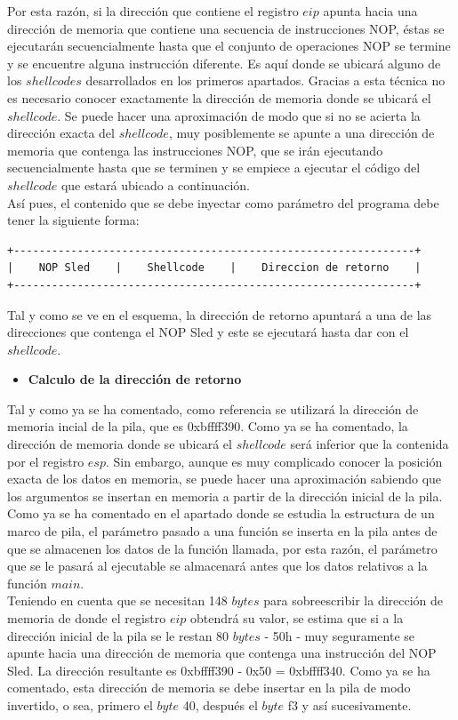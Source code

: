 \documentclass [titlepage, 12pt]{article}
\begin{document}
Por esta raz\'on, si la direcci\'on que contiene el registro $eip$ apunta hacia una direcci\'on de memoria que contiene una secuencia de instrucciones NOP, \'estas se ejecutar\'an secuencialmente hasta que el conjunto de operaciones NOP se termine y se encuentre alguna instrucci\'on diferente. Es aqu\'i donde se ubicar\'a alguno de los $shellcodes$ desarrollados en los primeros apartados. Gracias a esta t\'ecnica no es necesario conocer exactamente la direcci\'on de memoria donde se ubicar\'a el $shellcode$. Se puede hacer una aproximaci\'on de modo que si no se acierta la direcci\'on exacta del $shellcode$, muy posiblemente se apunte a una direcci\'on de memoria que contenga las instrucciones NOP, que se ir\'an ejecutando secuencialmente hasta que se terminen y se empiece a ejecutar el c\'odigo del $shellcode$ que estar\'a ubicado a continuaci\'on. \\
As\'i pues, el contenido que se debe inyectar como par\'ametro del programa debe tener la siguiente forma:

\begin{verbatim}
+---------------------------------------------------------------+
|    NOP Sled    |    Shellcode    |    Direccion de retorno    |
+---------------------------------------------------------------+
\end{verbatim}

Tal y como se ve en el esquema, la direcci\'on de retorno apuntar\'a a una de las direcciones que contenga el NOP Sled y este se ejecutar\'a hasta dar con el $shellcode$.

\begin{itemize}
	\item \textbf{Calculo de la direcci\'on de retorno}
\end{itemize}

Tal y como ya se ha comentado, como referencia se utilizar\'a la direcci\'on de memoria incial de la pila, que es 0xbffff390. Como ya se ha comentado, la direcci\'on de memoria donde se ubicar\'a el $shellcode$ ser\'a inferior que la contenida por el registro $esp$. Sin embargo, aunque es muy complicado conocer la posici\'on exacta de los datos en memoria, se puede hacer una aproximaci\'on sabiendo que los argumentos se insertan en memoria a partir de la direcci\'on inicial de la pila. Como ya se ha comentado en el apartado donde se estudia la estructura de un marco de pila, el par\'ametro pasado a una funci\'on se inserta en la pila antes de que se almacenen los datos de la funci\'on llamada, por esta raz\'on, el par\'ametro que se le pasar\'a al ejecutable se almacenar\'a antes que los datos relativos a la funci\'on $main$.\\
Teniendo en cuenta que se necesitan 148 $bytes$ para sobreescribir la direcci\'on de memoria de donde el registro $eip$ obtendr\'a su valor, se estima que si a la direcci\'on inicial de la pila se le restan 80 $bytes$ - 50h - muy seguramente se apunte hacia una direcci\'on de memoria que contenga una instrucci\'on del NOP Sled. La direcci\'on resultante es 0xbffff390 - 0x50 = 0xbffff340. Como ya se ha comentado, esta direcci\'on de memoria se debe insertar en la pila de modo invertido, o sea, primero el $byte$ 40, despu\'es el $byte$ f3 y as\'i sucesivamente.\\
\end{document}
